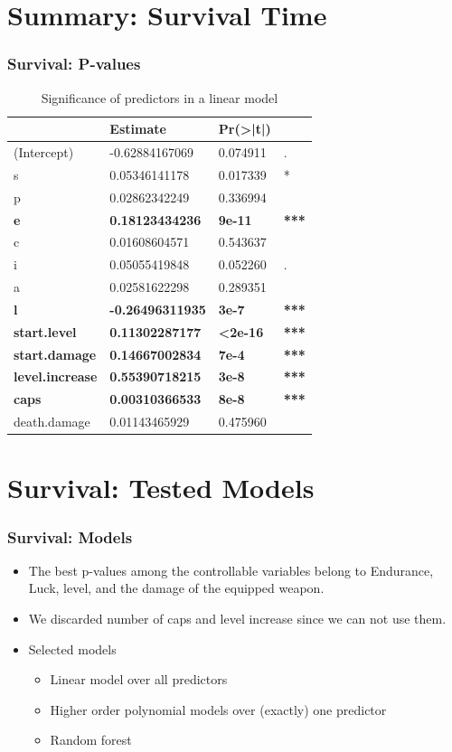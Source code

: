 \documentclass{beamer}
\begin{document}
\section{Summary: Survival Time}
\begin{frame}
  \frametitle{Survival: P-values}
\begin{table}[]
\centering
\caption{Significance of predictors in a linear model}
\label{table:survival.time}
\begin{tabular}{l|lll}
&Estimate&Pr(>|t|)& \\ 
\hline
(Intercept)    & -0.62884167069  & 0.074911&. \\ 
s              & 0.05346141178    & 0.017339 &*\\
p              & 0.02862342249    & 0.336994 &\\
\textbf{e}		& \textbf{0.18123434236}    & \textbf{9e-11}&\textbf{***} \\
c              & 0.01608604571    & 0.543637& \\
i              & 0.05055419848    & 0.052260& .\\
a              & 0.02581622298    & 0.289351& \\
\textbf{l}              & \textbf{-0.26496311935}  & \textbf{3e-7}&\textbf{***} \\
\textbf{start.level}    & \textbf{0.11302287177}   & \textbf{<2e-16}&\textbf{***} \\
\textbf{start.damage}   & \textbf{0.14667002834}    & \textbf{7e-4}&\textbf{***} \\
\textbf{level.increase} & \textbf{0.55390718215}    & \textbf{3e-8} &\textbf{***}\\
\textbf{caps}           & \textbf{0.00310366533}    & \textbf{8e-8}&\textbf{***} \\
death.damage   & 0.01143465929    & 0.475960&\\
\hline
\end{tabular}
\end{table}
\end{frame}

\section{Survival: Tested Models}
\begin{frame}
  \frametitle{Survival: Models}
  \begin{itemize}
  \item The best p-values among the controllable variables belong to Endurance, Luck, level, and the damage of the equipped weapon.
  \item We discarded number of caps and level increase since we can not use them.
  \item Selected models
    \begin{itemize}
    \item Linear model over all predictors
    \item Higher order polynomial models over (exactly) one predictor
    \item Random forest
    \end{itemize}
  \end{itemize}
\end{frame}
\end{document}
